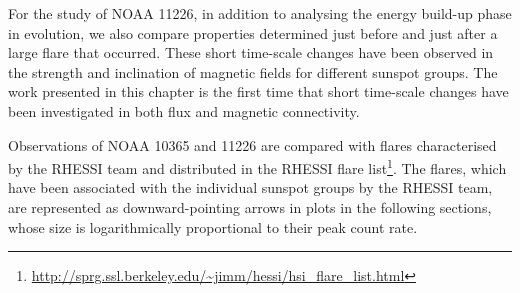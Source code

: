 For the study of NOAA 11226, in addition to analysing the energy build-up phase in evolution, we also compare properties determined just before and just after a large flare that occurred. These short time-scale changes have been observed in the strength \citep{Sudol:2005} and inclination \citep{Murray:2012} of magnetic fields for different sunspot groups. The work presented in this chapter is the first time that short time-scale changes have been investigated in both flux and magnetic connectivity.

Observations of NOAA 10365 and 11226 are compared with flares characterised by the \gls{RHESSI} team and distributed in the \gls{RHESSI} flare list\footnote{\url{http://sprg.ssl.berkeley.edu/\~jimm/hessi/hsi_flare_list.html}}. The flares, which have been associated with the individual sunspot groups by the \gls{RHESSI} team, are represented as downward-pointing arrows in plots in the following sections, whose size is logarithmically proportional to their peak count rate. 

